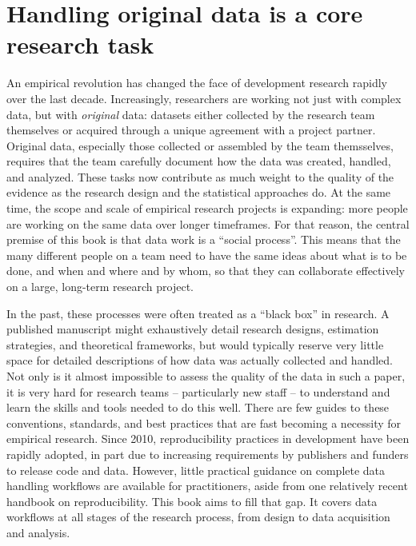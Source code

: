 \section{Handling original data is a core research task}

An empirical revolution has changed the face of development research rapidly over the last decade.
Increasingly, researchers are working not just with complex data,
but with \textit{original} data:
datasets either collected by the research team themselves
or acquired through a unique agreement with a project partner.
Original data, especially those collected or assembled by the team themsselves,
requires that the team carefully document how the data was created, handled, and analyzed.
These tasks now contribute as much weight to the quality of the evidence
as the research design and the statistical approaches do.
At the same time, the scope and scale of empirical research projects is expanding:
more people are working on the same data over longer timeframes.
For that reason, the central premise of this book is that data work is a ``social process''.
This means that the many different people on a team need to have the same ideas
about what is to be done, and when and where and by whom,
so that they can collaborate effectively on a large, long-term research project.

In the past, these processes were often treated as a ``black box'' in research.
A published manuscript might exhaustively detail
research designs, estimation strategies, and theoretical frameworks,
but would typically reserve very little space for detailed descriptions
of how data was actually collected and handled.
Not only is it almost impossible to assess the quality of the data in such a paper,
it is very hard for research teams -- particularly new staff --
to understand and learn the skills and tools needed to do this well.
There are few guides to these conventions, standards, and best practices
that are fast becoming a necessity for empirical research.
Since 2010, reproducibility practices in development have been rapidly adopted,\cite{swanson2020research}
in part due to increasing requirements by publishers and funders to release code and data.
However, little practical guidance on complete data handling workflows are available for practitioners,
aside from one relatively recent handbook on reproducibility.\cite{christensen2019transparent}
This book aims to fill that gap.
It covers data workflows at all stages of the research process,
from design to data acquisition and analysis.

